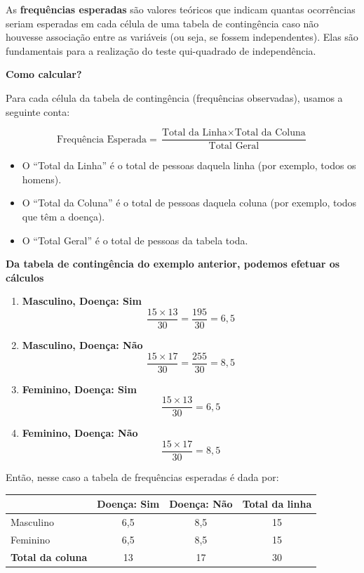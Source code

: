 \documentclass[
]{book}
\newcounter{none} %
\begin{document}
As \textbf{frequências esperadas} são valores teóricos que indicam quantas ocorrências seriam esperadas em cada célula de uma tabela de contingência caso não houvesse associação entre as variáveis (ou seja, se fossem independentes). Elas são fundamentais para a realização do teste qui-quadrado de independência.

\textbf{Como calcular?}

Para cada célula da tabela de contingência (frequências observadas), usamos a seguinte conta:

\[
\text{Frequência Esperada} = \frac{\text{Total da Linha} \times \text{Total da Coluna}}{\text{Total Geral}}
\]

\begin{itemize}
\item
  O ``Total da Linha'' é o total de pessoas daquela linha (por exemplo, todos os homens).
\item
  O ``Total da Coluna'' é o total de pessoas daquela coluna (por exemplo, todos que têm a doença).
\item
  O ``Total Geral'' é o total de pessoas da tabela toda.
\end{itemize}

\textbf{Da tabela de contingência do exemplo anterior, podemos efetuar os cálculos}

\begin{enumerate}
\def\labelenumi{\arabic{enumi}.}
\item
  \textbf{Masculino, Doença: Sim}
  \[
  \frac{15 \times 13}{30} = \frac{195}{30} = 6,5
  \]
\item
  \textbf{Masculino, Doença: Não}
  \[
  \frac{15 \times 17}{30} = \frac{255}{30} = 8,5
  \]
\item
  \textbf{Feminino, Doença: Sim}
  \[
  \frac{15 \times 13}{30} = 6,5
  \]
\item
  \textbf{Feminino, Doença: Não}
  \[
  \frac{15 \times 17}{30} = 8,5
  \]
\end{enumerate}

Então, nesse caso a tabela de frequências esperadas é dada por:

{\def\LTcaptype{none} %
\begin{longtable}[]{@{}lccc@{}}
\toprule\noalign{}
& Doença: Sim & Doença: Não & Total da linha \\
\midrule\noalign{}
\endhead
\bottomrule\noalign{}
\endlastfoot
Masculino & 6,5 & 8,5 & 15 \\
Feminino & 6,5 & 8,5 & 15 \\
\textbf{Total da coluna} & 13 & 17 & 30 \\
\end{longtable}
}
\end{document}
